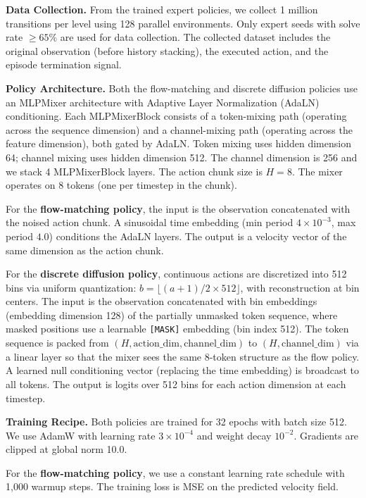 \documentclass{article}
\begin{document}
\textbf{Data Collection.}
From the trained expert policies, we collect 1 million transitions per level using 128 parallel environments.
Only expert seeds with solve rate $\geq 65\%$ are used for data collection.
The collected dataset includes the original observation (before history stacking), the executed action, and the episode termination signal.

\textbf{Policy Architecture.}
Both the flow-matching and discrete diffusion policies use an MLPMixer architecture with Adaptive Layer Normalization (AdaLN) conditioning.
Each MLPMixerBlock consists of a token-mixing path (operating across the sequence dimension) and a channel-mixing path (operating across the feature dimension), both gated by AdaLN.
Token mixing uses hidden dimension 64; channel mixing uses hidden dimension 512.
The channel dimension is 256 and we stack 4 MLPMixerBlock layers.
The action chunk size is $H=8$.
The mixer operates on 8 tokens (one per timestep in the chunk).

For the \textbf{flow-matching policy}, the input is the observation concatenated with the noised action chunk.
A sinusoidal time embedding (min period $4\times 10^{-3}$, max period $4.0$) conditions the AdaLN layers.
The output is a velocity vector of the same dimension as the action chunk.

For the \textbf{discrete diffusion policy}, continuous actions are discretized into 512 bins via uniform quantization: $b = \lfloor (a + 1) / 2 \times 512 \rfloor$, with reconstruction at bin centers.
The input is the observation concatenated with bin embeddings (embedding dimension 128) of the partially unmasked token sequence, where masked positions use a learnable \texttt{[MASK]} embedding (bin index 512).
The token sequence is packed from $(H, \text{action\_dim}, \text{channel\_dim})$ to $(H, \text{channel\_dim})$ via a linear layer so that the mixer sees the same 8-token structure as the flow policy.
A learned null conditioning vector (replacing the time embedding) is broadcast to all tokens.
The output is logits over 512 bins for each action dimension at each timestep.

\textbf{Training Recipe.}
Both policies are trained for 32 epochs with batch size 512.
We use AdamW with learning rate $3 \times 10^{-4}$ and weight decay $10^{-2}$.
Gradients are clipped at global norm 10.0.

For the \textbf{flow-matching policy}, we use a constant learning rate schedule with 1{,}000 warmup steps.
The training loss is MSE on the predicted velocity field.
\end{document}
